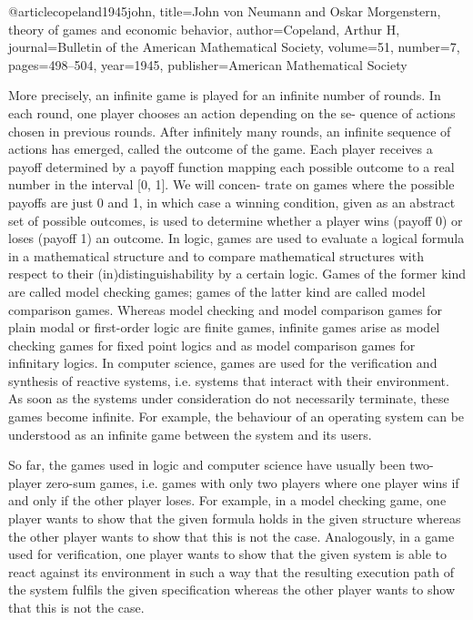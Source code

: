 @article{copeland1945john,
  title={John von Neumann and Oskar Morgenstern, theory of games and economic behavior},
  author={Copeland, Arthur H},
  journal={Bulletin of the American Mathematical Society},
  volume={51},
  number={7},
  pages={498--504},
  year={1945},
  publisher={American Mathematical Society}
}



More precisely, an infinite game is played for an infinite number of
rounds. In each round, one player chooses an action depending on the se-
quence of actions chosen in previous rounds. After infinitely many rounds,
an infinite sequence of actions has emerged, called the outcome of the game.
Each player receives a payoff determined by a payoff function mapping each
possible outcome to a real number in the interval [0, 1]. We will concen-
trate on games where the possible payoffs are just 0 and 1, in which case a
winning condition, given as an abstract set of possible outcomes, is used to
determine whether a player wins (payoff 0) or loses (payoff 1) an outcome.
In logic, games are used to evaluate a logical formula in a mathematical
structure and to compare mathematical structures with respect to their
(in)distinguishability by a certain logic. Games of the former kind are called
model checking games; games of the latter kind are called model comparison
games. Whereas model checking and model comparison games for plain
modal or first-order logic are finite games, infinite games arise as model
checking games for fixed point logics and as model comparison games for
infinitary logics.
In computer science, games are used for the verification and synthesis
of reactive systems, i.e. systems that interact with their environment. As
soon as the systems under consideration do not necessarily terminate, these
games become infinite. For example, the behaviour of an operating system
can be understood as an infinite game between the system and its users.


So far, the games used in logic and computer science have usually been
two-player zero-sum games, i.e. games with only two players where one
player wins if and only if the other player loses. For example, in a model
checking game, one player wants to show that the given formula holds in the
given structure whereas the other player wants to show that this is not the
case. Analogously, in a game used for verification, one player wants to show
that the given system is able to react against its environment in such a way
that the resulting execution path of the system fulfils the given specification
whereas the other player wants to show that this is not the case.



